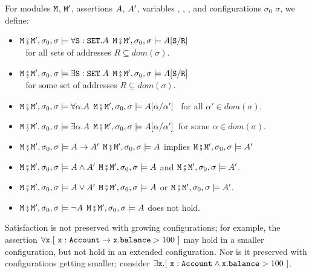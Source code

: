 \begin{definition}  
\label{def:valid:assertion:logical}
For modules $\M$, $\M'$, assertions $\A$, $\A'$, variables , , ,  and configurations $\sigma_0$ $\sigma$, we define$:$
\begin{itemize}
\item
$\M\mkpair \M',\sigma_0 ,  \sigma \models \forall \prg{S}:\prg{SET}.\A$ \IFF  $\M\mkpair \M', \sigma_0 ,  \sigma \models  \A[\prg{S}/\prg{R}]$ \\
$\strut ~ $ \hfill for all sets of addresses $R\subseteq dom(\sigma)$.
\item
$\M\mkpair \M',\sigma_0 ,\sigma \models \exists \prg{S}:\prg{SET}\!.\,\A$ \IFF  $\M\mkpair \M', \sigma_0  ,  \sigma \models  \A[\prg{S}/\prg{R}]$ \\
 $\strut ~ $ \hfill  for some set of addresses $R\subseteq dom(\sigma)$.
\item
$\M\mkpair \M',\sigma_0 ,\sigma \models \forall \alpha.\A$ \IFF
$\M\mkpair \M',\sigma_0 ,\sigma \models  \A[\alpha/\alpha']$ \ for all  $\alpha'\in dom(\sigma)$.
\item
$\M\mkpair \M',\sigma_0 , \sigma \models \exists \alpha.\A$ \IFF
$\M\mkpair \M', \sigma_0 , \sigma \models  \A[\alpha/\alpha']$\ for some  $\alpha
\in dom(\sigma)$.
\item
$\M\mkpair \M',\sigma_0 , \sigma \models \A \rightarrow \A' $ \IFF  $\M\mkpair \M',\sigma_0 ,   \sigma \models \A $ implies $\M\mkpair \M',\sigma_0 ,   \sigma \models \A' $
\item
$\M\mkpair \M',\sigma_0 ,  \sigma \models  \A \wedge \A'$   \IFF  $\M\mkpair \M',\sigma_0 ,   \sigma \models  \A $
and $\M\mkpair \M',\sigma_0 ,   \sigma \models  \A'$.
\item
$\M\mkpair \M',\sigma_0 ,  \sigma \models  \A \vee \A'$   \IFF  $\M\mkpair \M', \sigma_0 , \sigma \models  \A $
or $\M\mkpair \M',\sigma_0 ,  \sigma \models  \A'$.
\item
$\M\mkpair \M',\sigma_0 ,  \sigma \models  \neg\A$   \IFF  $\M\mkpair \M',\sigma_0 ,  \sigma \models  \A $
does not hold.
\end{itemize}
\end{definition}


Satisfaction is not preserved with growing configurations; for example, the assertion $\forall \x. [\ \x : \prg{Account} \rightarrow \x.\prg{balance}>100\ ]$ 
may hold in a smaller configuration, but not hold in an extended configuration. 
Nor is it preserved with configurations getting smaller; consider \eg $\exists \x. [\ \x : \prg{Account} \wedge \x.\prg{balance}>100\ ]$.

